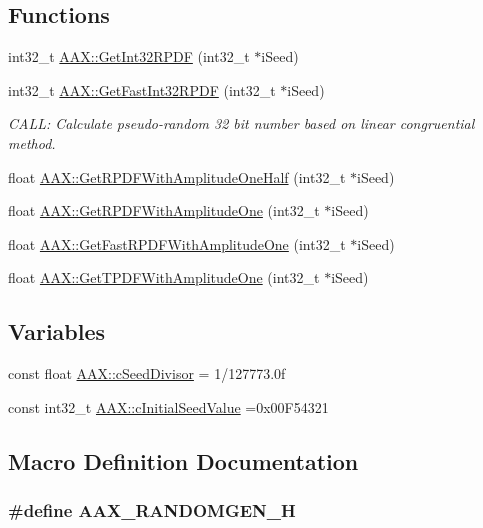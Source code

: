 \subsection*{Functions}
\begin{DoxyCompactItemize}
\item 
int32\+\_\+t \hyperlink{a00288_af3435129d3c94c5f3d5e671943b9bbe2}{A\+A\+X\+::\+Get\+Int32\+R\+P\+D\+F} (int32\+\_\+t $\ast$i\+Seed)
\item 
int32\+\_\+t \hyperlink{a00288_ad12251899137d551b9f652b1ffee2f99}{A\+A\+X\+::\+Get\+Fast\+Int32\+R\+P\+D\+F} (int32\+\_\+t $\ast$i\+Seed)
\begin{DoxyCompactList}\small\item\em C\+A\+L\+L\+: Calculate pseudo-\/random 32 bit number based on linear congruential method. \end{DoxyCompactList}\item 
float \hyperlink{a00288_a5a91375167236862abc93ad879639cab}{A\+A\+X\+::\+Get\+R\+P\+D\+F\+With\+Amplitude\+One\+Half} (int32\+\_\+t $\ast$i\+Seed)
\item 
float \hyperlink{a00288_a51d7a263d9053276c6cef1dbd2018ebe}{A\+A\+X\+::\+Get\+R\+P\+D\+F\+With\+Amplitude\+One} (int32\+\_\+t $\ast$i\+Seed)
\item 
float \hyperlink{a00288_a145cc6d06cd682e2d234d07ce939760e}{A\+A\+X\+::\+Get\+Fast\+R\+P\+D\+F\+With\+Amplitude\+One} (int32\+\_\+t $\ast$i\+Seed)
\item 
float \hyperlink{a00288_a42cc414ea1b868e26c591041a66ad8af}{A\+A\+X\+::\+Get\+T\+P\+D\+F\+With\+Amplitude\+One} (int32\+\_\+t $\ast$i\+Seed)
\end{DoxyCompactItemize}
\subsection*{Variables}
\begin{DoxyCompactItemize}
\item 
const float \hyperlink{a00288_a0c975151f0d47cc80eef9ff5a7c80125}{A\+A\+X\+::c\+Seed\+Divisor} = 1/127773.\+0f
\item 
const int32\+\_\+t \hyperlink{a00288_a143d659ccb62ae0807e9902e751b14cf}{A\+A\+X\+::c\+Initial\+Seed\+Value} =0x00\+F54321
\end{DoxyCompactItemize}


\subsection{Macro Definition Documentation}
\hypertarget{a00289_a037b85bd9c13c42dee11b4016fa2d90a}{}
\subsubsection[{A\+A\+X\+\_\+\+R\+A\+N\+D\+O\+M\+G\+E\+N\+\_\+\+H}]{\setlength{\rightskip}{0pt plus 5cm}\#define A\+A\+X\+\_\+\+R\+A\+N\+D\+O\+M\+G\+E\+N\+\_\+\+H}\label{a00289_a037b85bd9c13c42dee11b4016fa2d90a}
